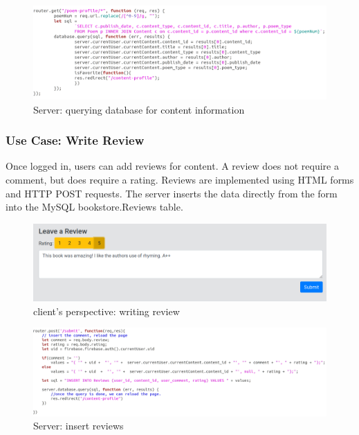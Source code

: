 \documentclass[letter, 12pt, titlepage]{article}
\begin{document}
	\begin{figure}[h!]
		\centering
		\includegraphics[scale=0.32]{content-profile-code.png}
		\caption{Server:  querying database for content information}
	\end{figure}

\newpage




\subsubsection{Use Case: Write Review}
	Once logged in, users can add reviews for content. A review does not require a comment, but does require a rating. Reviews are implemented using HTML forms and HTTP POST requests. The server inserts the data directly from the form into the MySQL bookstore.Reviews table. 
	\begin{figure}[h!]
		\centering
		\includegraphics[scale=0.43]{review.png}
		\caption{client's perspective: writing review}
	\end{figure}

	\begin{figure}[h!]
		\centering
		\includegraphics[scale=0.42]{review-code.png}
		\caption{Server: insert reviews}
	\end{figure}
\end{document}

